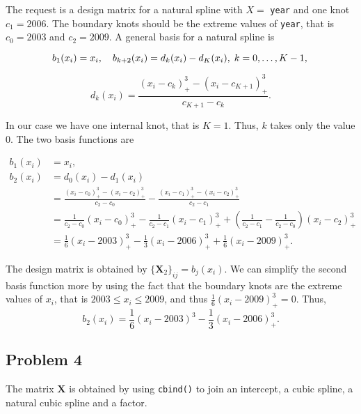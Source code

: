 \documentclass[
]{article}
\begin{document}
The request is a design matrix for a natural spline with \(X =\)
\texttt{year} and one knot \(c_1 = 2006\). The boundary knots should be
the extreme values of \texttt{year}, that is \(c_0 = 2003\) and
\(c_2 = 2009\). A general basis for a natural spline is

\[
b_1(x_i) = x_i, \quad b_{k+2}(x_i) = d_k(x_i)-d_K(x_i),\; k = 0, \ldots, K - 1,\\
\]

\[
d_k(x_i) = \frac{(x_i-c_k)^3_+-(x_i-c_{K+1})^3_+}{c_{K+1}-c_k}.
\]

In our case we have one internal knot, that is \(K=1\). Thus, \(k\)
takes only the value \(0\). The two basis functions are

\begin{align*}
b_1(x_i) &= x_i,\\
b_2(x_i) &= d_0(x_i)-d_1(x_i)\\
&= \frac{(x_i-c_0)^3_+-(x_i-c_2)^3_+}{c_2-c_0} - \frac{(x_i-c_1)^3_+-(x_i-c_2)^3_+}{c_2-c_1}\\
&= \frac{1}{c_2-c_0}(x_i-c_0)^3_+ - \frac{1}{c_2-c_1}(x_i-c_1)^3_+ + \left(\frac{1}{c_2-c_1}-\frac{1}{c_2-c_0}\right)(x_i-c_{2})^3_+\\
&= \frac{1}{6}(x_i-2003)^3_+ - \frac{1}{3}(x_i-2006)^3_+ + \frac{1}{6}(x_i-2009)^3_+.
\end{align*}

The design matrix is obtained by \(\{\mathbf X_2\}_{ij} = b_j(x_i)\). We
can simplify the second basis function more by using the fact that the
boundary knots are the extreme values of \(x_i\), that is
\(2003 \leq x_i \leq 2009\), and thus \(\frac{1}{6}(x_i-2009)^3_+=0\).
Thus, \[
b_2(x_i) = \frac{1}{6}(x_i-2003)^3 - \frac{1}{3}(x_i-2006)^3_+.
\]

\hypertarget{problem-4}{%
\subsection{Problem 4}\label{problem-4}}

The matrix \(\mathbf X\) is obtained by using \texttt{cbind()} to join
an intercept, a cubic spline, a natural cubic spline and a factor.
\end{document}
